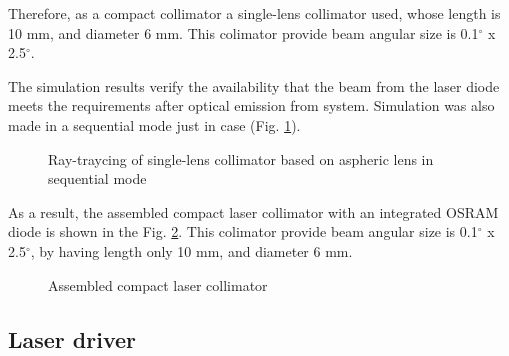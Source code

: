 Therefore, as a compact collimator a single-lens collimator used, whose length is 10 mm, and diameter 6 mm.
This colimator provide beam angular size is 0.1$^\circ$ x 2.5$^\circ$.


The simulation results verify the availability that the beam from the laser diode meets the requirements after optical emission from system.
Simulation was also made in a sequential mode just in case (Fig. \ref{fig:ld_sequential}).


\begin{figure}[h]
\caption{Ray-traycing of single-lens collimator based on aspheric lens in sequential mode}
\label{fig:ld_sequential} 
\end{figure}


As a result, the assembled compact laser collimator with an integrated OSRAM diode is shown in the Fig. \ref{fig:ld_assembled}.
This colimator provide beam angular size is 0.1$^\circ$ x 2.5$^\circ$, by having length only 10 mm, and diameter 6 mm.

\begin{figure}[h]
\center{\texttt{[image: ld]}}
\caption{Assembled compact laser collimator}
\label{fig:ld_assembled} 
\end{figure}


\subsection{Laser driver}

